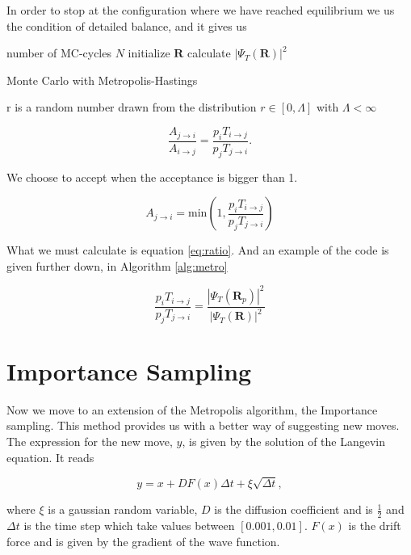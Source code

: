In order to stop at the configuration where we have reached equilibrium we us the condition of detailed balance, and it gives us 

\begin{algorithm}
number of MC-cycles $N$\;
initialize $\mathbf{R}$\;
calculate $|\Psi_T(\mathbf{R})|^2$\;
 \caption{Monte Carlo with Metropolis-Hastings}\label{alg:metro}
\end{algorithm}

r is a random number drawn from the distribution $r \in [0, \Lambda]$ with $\Lambda < \infty$

$$\frac{A_{j \rightarrow i}}{A_{i \rightarrow j}} = \frac{p_i T_{i \rightarrow j}}{p_j T_{j \rightarrow i}}.$$

We choose to accept when the acceptance is bigger than 1. 

$$A_{j \rightarrow i} = \mathrm{min} \left( 1, \frac{p_i T_{i \rightarrow j}}{p_j T_{j \rightarrow i}}\right)$$

What we must calculate is equation \ref{eq:ratio}. And an example of the code is given further down, in Algorithm \ref{alg:metro}

\begin{equation}\label{eq:ratio}
\frac{p_i T_{i \rightarrow j}}{p_j T_{j \rightarrow i}} = \frac{|\Psi_T(\mathbf{R}_p)|^2}{|\Psi_T(\mathbf{R})|^2}
\end{equation}

\section{Importance Sampling}

Now we move to an extension of the Metropolis algorithm, the Importance sampling. This method provides us with a better way of suggesting new moves. The expression for the new move, $y$, is given by the solution of the Langevin equation. It reads 

$$y = x + D F(x) \Delta t + \xi \sqrt{\Delta t},$$

where $\xi$ is a gaussian random variable, $D$ is the diffusion coefficient and is $\frac{1}{2}$ and $\Delta t$ is the time step which take values between $[0.001, 0.01]$.
$F(x)$ is the drift force and is given by the gradient of the wave function. 

